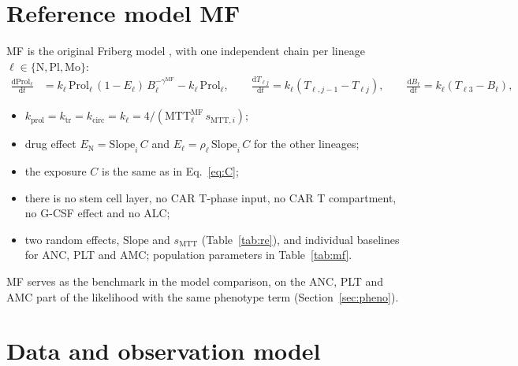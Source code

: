 \documentclass[11pt]{article}
\newcommand{\dd}{\mathrm{d}}
\begin{document}


\section{Reference model MF}\label{sec:mf}
MF is the original Friberg model \citep{friberg2002}, with one independent chain per lineage $\ell\in\{\mathrm{N},\mathrm{Pl},\mathrm{Mo}\}$:
\begin{align}
\frac{\dd \mathrm{Prol}_\ell}{\dd t} &= k_\ell\,\mathrm{Prol}_\ell\,(1-E_\ell)\,B_\ell^{-\gamma^{\mathrm{MF}}} - k_\ell\,\mathrm{Prol}_\ell,\qquad
\frac{\dd T_{\ell j}}{\dd t} = k_\ell(T_{\ell,j-1}-T_{\ell j}),\qquad
\frac{\dd B_\ell}{\dd t} = k_\ell(T_{\ell3}-B_\ell),
\end{align}
\begin{itemize}
\item $k_{\mathrm{prol}}=k_{\mathrm{tr}}=k_{\mathrm{circ}}=k_\ell=4/(\mathrm{MTT}^{\mathrm{MF}}_\ell\,s_{\mathrm{MTT},i})$;
\item drug effect $E_{\mathrm{N}}=\mathrm{Slope}_i\,C$ and $E_\ell=\rho_\ell\,\mathrm{Slope}_i\,C$ for the other lineages;
\item the exposure $C$ is the same as in Eq.~\ref{eq:C};
\item there is no stem cell layer, no CAR T-phase input, no CAR T compartment, no G-CSF effect and no ALC;
\item two random effects, $\mathrm{Slope}$ and $s_{\mathrm{MTT}}$ (Table~\ref{tab:re}), and individual baselines for ANC, PLT and AMC; population parameters in Table~\ref{tab:mf}.
\end{itemize}
MF serves as the benchmark in the model comparison, on the ANC, PLT and AMC part of the likelihood with the same phenotype term (Section~\ref{sec:pheno}).

\section{Data and observation model}\label{sec:obs}
\end{document}
